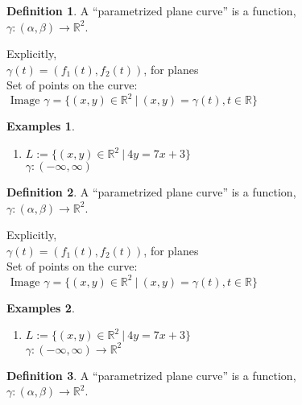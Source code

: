 \documentclass[twocolumn,20pt,fleqn]{extarticle}
\theoremstyle{plain}
\theoremstyle{definition}
\newtheorem*{definition}{Definition}
\newtheorem*{exmpls}{Examples}
\theoremstyle{remark}
\newenvironment*{examples}{\begin{exmpls} ~ \begin{enumerate}}{\end{enumerate}\end{exmpls}}
\begin{document}
\clearpage




\begin{definition}
  A  ``parametrized plane curve''  is a  function,\\ $\gamma  : (\alpha, \beta) \to \mathbb{R}^2$.
\end{definition}

Explicitly,\\
$\gamma(t) = (f_1(t), f_2(t))$, for planes\\

Set of points on the curve:\\  $\textrm{ Image } \gamma = \{(x,y) \in \mathbb{R}^2 \ |\ (x,y) = \gamma(t), t \in \mathbb{R}\}$




\begin{examples}
  \item $L:=\{(x,y) \in \mathbb{R}^2\ |\ 4y = 7x + 3\}$\\
  $\gamma  : (-\infty,\infty) $\end{examples}


\clearpage




\begin{definition}
  A  ``parametrized plane curve''  is a  function,\\ $\gamma  : (\alpha, \beta) \to \mathbb{R}^2$.
\end{definition}

Explicitly,\\
$\gamma(t) = (f_1(t), f_2(t))$, for planes\\

Set of points on the curve:\\  $\textrm{ Image } \gamma = \{(x,y) \in \mathbb{R}^2 \ |\ (x,y) = \gamma(t), t \in \mathbb{R}\}$




\begin{examples}
  \item $L:=\{(x,y) \in \mathbb{R}^2\ |\ 4y = 7x + 3\}$\\
  $\gamma  : (-\infty,\infty) \to \mathbb{R}^2$ \end{examples}


\clearpage




\begin{definition}
  A  ``parametrized plane curve''  is a  function,\\ $\gamma  : (\alpha, \beta) \to \mathbb{R}^2$.
\end{definition}
\end{document}
